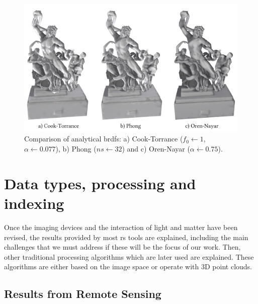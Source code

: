 \vspace{3mm}



\begin{figure}[ht]
	\includegraphics[width=\textwidth]{figs/fundamentals/analytical_brdf.png}
	\caption{Comparison of analytical \acrshort{brdf}s: a) Cook-Torrance ($f_0 \gets 1$, $\alpha \gets 0.077$), b) Phong ($ns \gets 32$) and c) Oren-Nayar ($\alpha \gets 0.75$). }
    \label{fig:analytical_brdf}
\end{figure}


\section{Data types, processing and indexing}
\label{sec:data_types}

Once the imaging devices and the interaction of light and matter have been revised, the results provided by most \acrshort{rs} tools are explained, including the main challenges that we must address if these will be the focus of our work. Then, other traditional processing algorithms which are later used are explained. These algorithms are either based on the image space or operate with 3D point clouds.

\subsection{Results from Remote Sensing}

